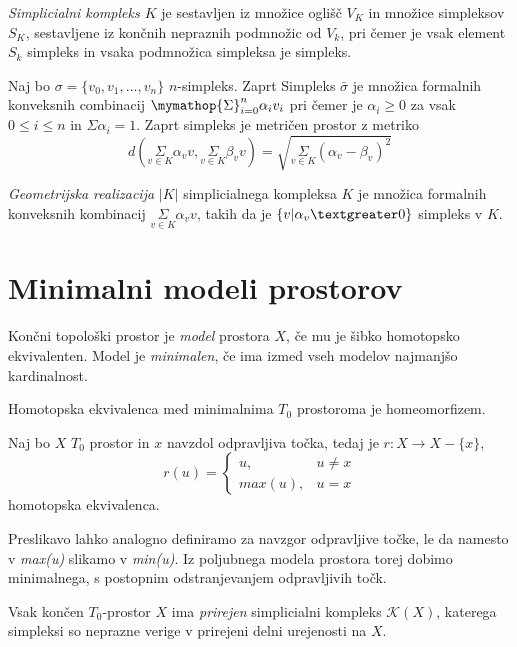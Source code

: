 \textit{Simplicialni kompleks $K$} je sestavljen iz množice oglišč $V_K$ in množice simpleksov $S_K$, sestavljene iz končnih nepraznih podmnožic od $V_k$, pri čemer je vsak element $S_k$ simpleks in vsaka podmnožica simpleksa je simpleks. 


Naj bo $\sigma = \{v_0,v_1,\ldots,v_n\}$ $n$-simpleks. Zaprt
Simpleks $\bar{\sigma}$ je množica formalnih konveksnih combinacij $\mymathop{\Sigma}_{i=0}^{n}\alpha_i v_i$
pri čemer je $\alpha_i \ge 0$ za vsak $0\le i \le n$ in $\Sigma \alpha_i = 1$. Zaprt simpleks je metričen prostor z metriko
$$
d(\underset{v \in K}{\Sigma}\alpha_v v,\underset{v \in K}{\Sigma}\beta_v v) = \sqrt{\underset{v \in K}{\Sigma}(\alpha_v - \beta_v)^2}
$$

\textit{Geometrijska realizacija} $|K|$ simplicialnega kompleksa $K$ je 
množica formalnih konveksnih kombinacij $\underset{v \in K}{\Sigma}\alpha_v v$, takih da je $\{v | \alpha_v \textgreater 0\}$ simpleks v $K$.


\section{Minimalni modeli prostorov}

\begin{definicija}
    Končni topološki prostor je \textit{model} prostora $X$, če mu je šibko homotopsko ekvivalenten. Model je \textit{minimalen}, če ima izmed vseh modelov najmanjšo kardinalnost.
\end{definicija}

\begin{izrek}
    Homotopska ekvivalenca med minimalnima $T_0$ prostoroma je homeomorfizem.
\end{izrek}

\begin{izrek}Naj bo $X$ $T_0$ prostor in $x$ navzdol odpravljiva točka, tedaj je $r: X \rightarrow X - \{x\}$, $$
    r(u) = \begin{cases}
        u, & u \neq x \\
        max(u), & u = x
    \end{cases}$$
homotopska ekvivalenca.
\end{izrek}

Preslikavo lahko analogno definiramo za navzgor odpravljive točke, le da namesto v \textit{max(u)} slikamo v \textit{min(u)}. 
Iz poljubnega modela prostora torej dobimo minimalnega, s postopnim odstranjevanjem odpravljivih točk.

\begin{definicija}
    Vsak končen $T_0$-prostor $X$ ima \textit{prirejen} simplicialni kompleks $\mathcal{K}(X)$, katerega simpleksi so neprazne verige v prirejeni delni urejenosti na $X$.
\end{definicija}



